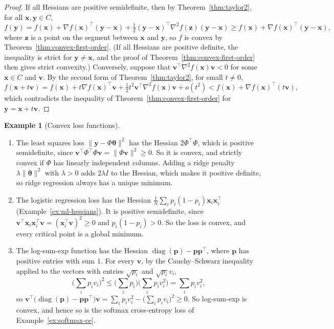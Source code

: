 \documentclass[11pt]{article}
\newcommand{\norm}[1]{\lVert #1 \rVert}
\theoremstyle{definition}
\newtheorem{example}[definition]{Example}
\theoremstyle{plain}
\theoremstyle{remark}
\DeclareMathOperator{\diag}{diag}
\begin{document}
\begin{proof}
    If all Hessians are positive semidefinite, then by Theorem~\ref{thm:taylor2}, for all $\mathbf{x}, \mathbf{y} \in C$,
    \[f(\mathbf{y}) = f(\mathbf{x}) + \nabla f(\mathbf{x})^\top(\mathbf{y} - \mathbf{x}) + \tfrac{1}{2}(\mathbf{y} - \mathbf{x})^\top\nabla^2 f(\mathbf{z})(\mathbf{y} - \mathbf{x}) \geq f(\mathbf{x}) + \nabla f(\mathbf{x})^\top(\mathbf{y} - \mathbf{x}),\]
    where $\mathbf{z}$ is a point on the segment between $\mathbf{x}$ and $\mathbf{y}$, so $f$ is convex by Theorem~\ref{thm:convex-first-order}. (If all Hessians are positive definite, the inequality is strict for $\mathbf{y} \neq \mathbf{x}$, and the proof of Theorem~\ref{thm:convex-first-order} then gives strict convexity.) Conversely, suppose that $\mathbf{v}^\top\nabla^2 f(\mathbf{x})\mathbf{v} < 0$ for some $\mathbf{x} \in C$ and $\mathbf{v}$. By the second form of Theorem~\ref{thm:taylor2}, for small $t \neq 0$,
    \[f(\mathbf{x} + t\mathbf{v}) = f(\mathbf{x}) + t\nabla f(\mathbf{x})^\top\mathbf{v} + \tfrac{1}{2}t^2\mathbf{v}^\top\nabla^2 f(\mathbf{x})\mathbf{v} + o(t^2) < f(\mathbf{x}) + \nabla f(\mathbf{x})^\top(t\mathbf{v}),\]
    which contradicts the inequality of Theorem~\ref{thm:convex-first-order} for $\mathbf{y} = \mathbf{x} + t\mathbf{v}$.
\end{proof}

\begin{example}[Convex loss functions]\label{ex:convex-losses}
    \begin{enumerate}
        \item The least squares loss $\norm{\mathbf{y} - \Phi\boldsymbol{\theta}}^2$ has the Hessian $2\Phi^\top\Phi$, which is positive semidefinite, since $\mathbf{v}^\top\Phi^\top\Phi\mathbf{v} = \norm{\Phi\mathbf{v}}^2 \geq 0$. So it is convex, and strictly convex if $\Phi$ has linearly independent columns. Adding a ridge penalty $\lambda\norm{\boldsymbol{\theta}}^2$ with $\lambda > 0$ adds $2\lambda I$ to the Hessian, which makes it positive definite, so ridge regression always has a unique minimum.
        \item The logistic regression loss has the Hessian $\frac{1}{N}\sum_i p_i(1 - p_i)\mathbf{x}_i\mathbf{x}_i^\top$ (Example~\ref{ex:ml-hessians}). It is positive semidefinite, since $\mathbf{v}^\top\mathbf{x}_i\mathbf{x}_i^\top\mathbf{v} = (\mathbf{x}_i^\top\mathbf{v})^2 \geq 0$ and $p_i(1 - p_i) > 0$. So the loss is convex, and every critical point is a global minimum.
        \item The log-sum-exp function has the Hessian $\diag(\mathbf{p}) - \mathbf{p}\mathbf{p}^\top$, where $\mathbf{p}$ has positive entries with sum $1$. For every $\mathbf{v}$, by the Cauchy--Schwarz inequality applied to the vectors with entries $\sqrt{p_i}$ and $\sqrt{p_i}v_i$,
        \[\Big(\sum_i p_i v_i\Big)^2 \leq \Big(\sum_i p_i\Big)\Big(\sum_i p_i v_i^2\Big) = \sum_i p_i v_i^2,\]
        so $\mathbf{v}^\top\big(\diag(\mathbf{p}) - \mathbf{p}\mathbf{p}^\top\big)\mathbf{v} = \sum_i p_i v_i^2 - \big(\sum_i p_i v_i\big)^2 \geq 0$.
        So log-sum-exp is convex, and hence so is the softmax cross-entropy loss of Example~\ref{ex:softmax-ce}.
    \end{enumerate}
\end{example}
\end{document}
